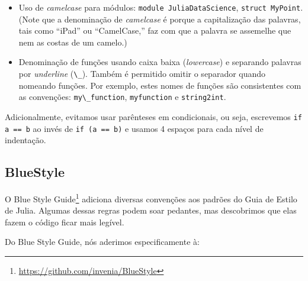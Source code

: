 \documentclass[
  notoc %
]{tufte-book}
\DeclareRobustCommand{\href}[2]{#2\footnote{\url{#1}}}
\providecommand{\tightlist}{%
  \setlength{\itemsep}{0pt}\setlength{\parskip}{0pt}
}
\newcommand{\passthrough}[1]{#1}
\begin{document}
\begin{itemize}
\tightlist
\item
  Uso de \emph{camelcase} para módulos:
  \passthrough{\lstinline!module JuliaDataScience!},
  \passthrough{\lstinline!struct MyPoint!}. (Note que a denominação de
  \emph{camelcase} é porque a capitalização das palavras, tais como
  ``iPad'' ou ``CamelCase,'' faz com que a palavra se assemelhe que nem
  as costas de um camelo.)
\item
  Denominação de funções usando caixa baixa (\emph{lowercase}) e
  separando palavras por \emph{underline}
  (\passthrough{\lstinline!\_!}). Também é permitido omitir o separador
  quando nomeando funções. Por exemplo, estes nomes de funções são
  consistentes com as convenções:
  \passthrough{\lstinline!my\_function!},
  \passthrough{\lstinline!myfunction!} e
  \passthrough{\lstinline!string2int!}.
\end{itemize}

Adicionalmente, evitamos usar parênteses em condicionais, ou seja,
escrevemos \passthrough{\lstinline!if a == b!} ao invés de
\passthrough{\lstinline!if (a == b)!} e usamos 4 espaços para cada nível
de indentação.

\hypertarget{bluestyle}{%
\subsection{BlueStyle}\label{bluestyle}}

O \href{https://github.com/invenia/BlueStyle}{Blue Style Guide} adiciona
diversas convenções aos padrões do Guia de Estilo de Julia. Algumas
dessas regras podem soar pedantes, mas descobrimos que elas fazem o
código ficar mais legível.

Do Blue Style Guide, nós aderimos especificamente à:
\end{document}
